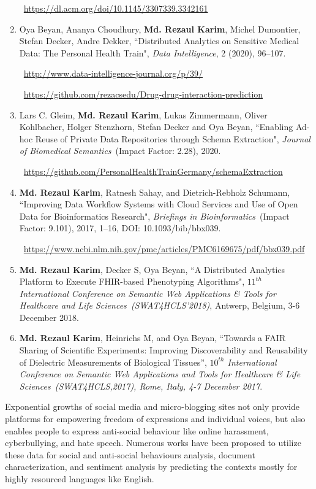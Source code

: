 \begin{appendices}
\begin{enumerate}[noitemsep]
	\faLink~\url{https://dl.acm.org/doi/10.1145/3307339.3342161}
	
	\item Oya Beyan, Ananya Choudhury, \textbf{Md. Rezaul Karim}, Michel Dumontier, Stefan Decker, Andre Dekker, ``Distributed Analytics on Sensitive Medical Data: The Personal Health Train", \emph{Data Intelligence}, 2 (2020), 96–107. 
    
    \faLink~\url{http://www.data-intelligence-journal.org/p/39/}

	\faGithub~\url{https://github.com/rezacsedu/Drug-drug-interaction-prediction} 
	\item Lars C. Gleim, \textbf{Md. Rezaul Karim}, Lukas Zimmermann, Oliver Kohlbacher, Holger Stenzhorn, Stefan Decker and Oya Beyan, ``Enabling Ad-hoc Reuse of Private Data Repositories through Schema Extraction", \emph{Journal of Biomedical Semantics}~(Impact Factor: 2.28), 2020. 
	
	\faGithub~\url{https://github.com/PersonalHealthTrainGermany/schemaExtraction}
	
    \item {{\bf Md. Rezaul Karim}, Ratnesh Sahay, and Dietrich-Rebholz Schumann, ``Improving Data Workflow Systems with Cloud Services and Use of Open Data for Bioinformatics Research", \emph{Briefings in Bioinformatics}~(Impact Factor: 9.101), 2017, 1–16, DOI: 10.1093/bib/bbx039.}
    
    \faLink~\url{https://www.ncbi.nlm.nih.gov/pmc/articles/PMC6169675/pdf/bbx039.pdf}
    
    \item \textbf{Md. Rezaul Karim}, Decker S, Oya Beyan, ``A Distributed Analytics Platform to Execute FHIR-based Phenotyping Algorithms", \emph{$11^{th}$ International Conference on Semantic Web Applications \& Tools for Healthcare and Life Sciences~(SWAT4HCLS'2018)}, Antwerp, Belgium, 3-6 December 2018.

    \item \textbf{Md. Rezaul Karim}, Heinrichs M, and Oya Beyan, ``Towards a FAIR Sharing of Scientific Experiments: Improving Discoverability and Reusability of Dielectric Measurements of Biological Tissues'', \emph{$10^{th}$ International Conference on Semantic Web Applications and Tools for Healthcare \& Life Sciences~(SWAT4HCLS,2017), Rome, Italy, 4-7 December 2017}.
\end{enumerate}

Exponential growths of social media and micro-blogging sites not only provide platforms for empowering freedom of expressions and individual voices, but also enables people to express anti-social behaviour like online harassment, cyberbullying, and hate speech. Numerous works have been proposed to utilize these data for social and anti-social behaviours analysis, document characterization, and sentiment analysis by predicting the contexts mostly for highly resourced languages like English. 


\end{appendices}

